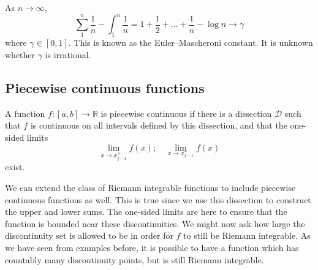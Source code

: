 \begin{corollary}
	As \(n \to \infty\),
	\[
		\sum_1^n \frac{1}{n} - \int_1^n \frac{1}{n} = 1 + \frac{1}{2} + \dots + \frac{1}{n} - \log n \to \gamma
	\]
	where \(\gamma \in [0, 1]\).
	This is known as the Euler--Mascheroni constant.
	It is unknown whether \(\gamma\) is irrational.
\end{corollary}

\subsection{Piecewise continuous functions}
\begin{definition}
	A function \(f \colon [a, b] \to \mathbb R\) is piecewise continuous if there is a dissection \(\mathcal D\) such that \(f\) is continuous on all intervals defined by this dissection, and that the one-sided limits
	\[
		\lim_{x \to x_{j-1}^+} f(x);\quad \lim_{x \to x_{j-1}^-} f(x)
	\]
	exist.
\end{definition}
We can extend the class of Riemann integrable functions to include piecewise continuous functions as well.
This is true since we use this dissection to construct the upper and lower sums.
The one-sided limits are here to ensure that the function is bounded near these discontinuities.
We might now ask how large the discontinuity set is allowed to be in order for \(f\) to still be Riemann integrable.
As we have seen from examples before, it is possible to have a function which has countably many discontinuity points, but is still Riemann integrable.
